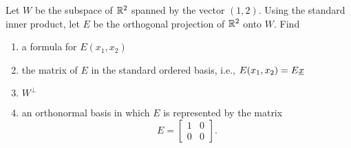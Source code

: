 \begin{problem}
Let $W$ be the subspace of $\mathbb{R}^2$ spanned by the vector $(1,2)$.
Using the standard inner product, let $E$ be the orthogonal projection of $\mathbb{R}^2$ onto $W$.
Find
\begin{enumerate}
\item a formula for $E(x_1, x_2)$
\item the matrix of $E$ in the standard ordered basis, i.e., $E(x_1, x_2) = E \underline{x}$
\item $W^{\bot}$
\item an orthonormal basis in which $E$ is represented by the matrix
\begin{equation*}
E = \left[ \begin{array}{cc} 1 & 0 \\ 0 & 0 \end{array} \right].
\end{equation*}
\end{enumerate}
\end{problem}


